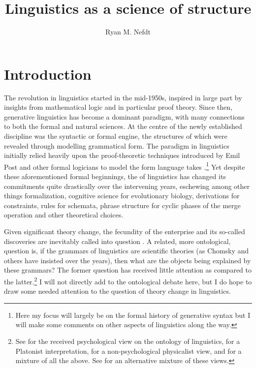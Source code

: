 \documentclass[output=paper]{langscibook}
\title{Linguistics as a science of structure}
\author{Ryan M. Nefdt \affiliation{University of the Western Cape}}
\begin{document}
\maketitle

\section{Introduction}
\label{sec:nefdt:intro}

The  revolution in linguistics started in the mid-1950s, inspired in large part by insights from mathematical logic and in particular proof theory. Since then, generative linguistics has become a dominant paradigm, with many connections to both the formal and natural sciences. At the centre of the newly established discipline was the syntactic or formal engine, the structures of which were revealed through modelling grammatical form. The  paradigm in linguistics initially relied heavily upon the proof-theoretic techniques introduced by Emil Post and other formal logicians to model the form language takes \citep{Tomalin2006, Pullum2011, Pullum2013}.\footnote{Here my focus will largely be on the formal history of generative syntax but I will make some comments on other aspects of linguistics along the way.} Yet despite these aforementioned formal beginnings, the  of linguistics has changed its commitments quite drastically over the intervening years, eschewing among other things formalization, cognitive science for evolutionary biology, derivations for constraints, rules for schemata, phrase structure for cyclic phases of the merge operation and other theoretical choices.  

Given significant theory change, the fecundity of the enterprise and its so-called discoveries are inevitably called into question \citep{Stokhof2011,Lappin2000,Jackendoff2002}. A related, more ontological, question is, if the grammars of linguistics are scientific theories (as Chomsky and others have insisted over the years), then what are the objects being explained by these grammars? The former question has received little attention as compared to the latter.\footnote {See \cite{Chomsky1986} for the received psychological view on the ontology of linguistics, \cite{Katz1991} for a Platonist interpretation, \cite{Devitt2006} for a non-psychological physicalist view, and \cite{Stainton2014} for a mixture of all the above. See \cite{Nefdt:2018} for an alternative mixture of these views.} I will not directly add to the ontological debate here, but I do hope to draw some needed attention to the question of theory change in linguistics. 
\end{document}

